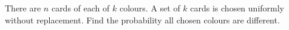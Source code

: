 There are $n$ cards of each of $k$ colours. A set of $k$ cards is chosen uniformly without replacement. Find the probability all chosen colours are different.
